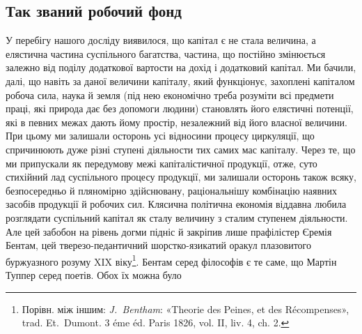 

\subsection{Так званий робочий фонд}

У перебігу нашого досліду виявилося, що капітал є не стала
величина, а елястична частина суспільного багатства, частина,
що постійно змінюється залежно від поділу додаткової вартости
на дохід і додатковий капітал. Ми бачили, далі, що навіть за
даної величини капіталу, який функціонує, захоплені капіталом
робоча сила, наука й земля (під нею економічно треба розуміти
всі предмети праці, які природа дає без допомоги людини) становлять
його елястичні потенції, які в певних межах дають йому
простір, незалежний від його власної величини. При цьому ми
залишали осторонь усі відносини процесу циркуляції, що спричинюють
дуже різні ступені діяльности тих самих мас капіталу.
Через те, що ми припускали як передумову межі капіталістичної
продукції, отже, суто стихійний лад суспільного процесу продукції,
ми залишали осторонь також всяку, безпосередньо й пляномірно
здійснювану, раціональнішу комбінацію наявних засобів
продукції й робочих сил. Клясична політична економія віддавна
любила розглядати суспільний капітал як сталу величину
з сталим ступенем діяльности. Але цей забобон на рівень догми
підніс й закріпив лише прафілістер Єремія Бентам, цей тверезо-педантичний
шорстко-язикатий оракул плазовитого буржуазного
розуму XIX віку\footnote{
Порівн. між іншим: \emph{J.~Bentham}: «Theorie des Peines, et des Récompenses»,
trad. Et.~Dumont. 3 éme éd. Paris 1826, vol. II, liv. 4, ch. 2.
}. Бентам серед філософів є те
саме, що Мартін Туппер серед поетів. Обох їх можна було

